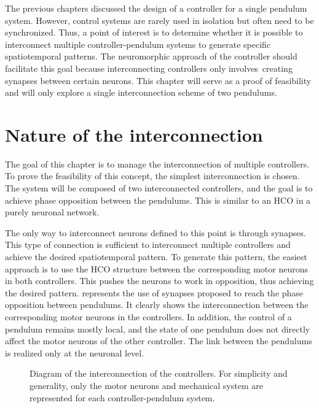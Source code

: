The previous chapters discussed the design of a controller for a single pendulum system. However, control systems are rarely used in isolation but often need to be synchronized.
Thus, a point of interest is to determine whether it is possible to interconnect multiple controller-pendulum systems to generate specific spatiotemporal patterns.
The neuromorphic approach of the controller should facilitate this goal because interconnecting controllers only involves creating synapses between certain neurons.
This chapter will serve as a proof of feasibility and will only explore a single interconnection scheme of two pendulums. 

\section{Nature of the interconnection}

The goal of this chapter is to manage the interconnection of multiple controllers.
To prove the feasibility of this concept, the simplest interconnection is chosen.
The system will be composed of two interconnected controllers, and the goal is to achieve phase opposition between the pendulums.
This is similar to an HCO in a purely neuronal network.

The only way to interconnect neurons defined to this point is through synapses.
This type of connection is sufficient to interconnect multiple controllers and achieve the desired spatiotemporal pattern.
To generate this pattern, the easiest approach is to use the HCO structure between the corresponding motor neurons in both controllers.
This pushes the neurons to work in opposition, thus achieving the desired pattern.
 represents the use of synapses proposed to reach the phase opposition between pendulums.
It clearly shows the interconnection between the corresponding motor neurons in the controllers.
In addition, the control of a pendulum remains mostly local, and the state of one pendulum does not directly affect the motor neurons of the other controller.
The link between the pendulums is realized only at the neuronal level.

\begin{figure}[!htbp]
    \centering
    \caption{Diagram of the interconnection of the controllers. For simplicity and generality, only the motor neurons and mechanical system are represented for each controller-pendulum system.}
    \label{fig:network_motor}
\end{figure}

